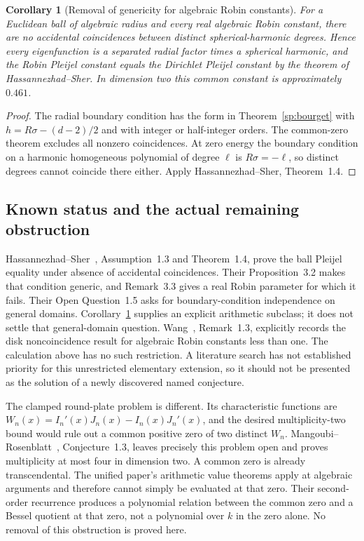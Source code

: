 \documentclass[11pt]{article}
\newtheorem{corollary}[theorem]{Corollary}
\theoremstyle{definition}
\theoremstyle{remark}
\begin{document}
\begin{corollary}[Removal of genericity for algebraic Robin constants]
\label{sp:pleijel}
For a Euclidean ball of algebraic radius and every real algebraic
Robin constant, there are no accidental coincidences between distinct
spherical-harmonic degrees.  Hence every eigenfunction is a separated
radial factor times a spherical harmonic, and the Robin Pleijel
constant equals the Dirichlet Pleijel constant by the theorem of
Hassannezhad--Sher.  In dimension two this common constant is
approximately $0.461$.
\end{corollary}
\begin{proof}
The radial boundary condition has the form in
Theorem~\ref{sp:bourget} with
$h=R\sigma-(d-2)/2$ and with integer or half-integer orders.
The common-zero theorem excludes all nonzero coincidences.  At zero
energy the boundary condition on a harmonic homogeneous polynomial of
degree $\ell$ is $R\sigma=-\ell$, so distinct degrees cannot coincide
there either.  Apply Hassannezhad--Sher, Theorem~1.4.
\end{proof}

\subsection{Known status and the actual remaining obstruction}

Hassannezhad--Sher~\cite{HS2024}, Assumption~1.3 and Theorem~1.4, prove the
ball Pleijel equality under absence of accidental coincidences.  Their
Proposition~3.2 makes that condition generic, and Remark~3.3 gives a
real Robin parameter for which it fails.  Their Open Question~1.5
asks for boundary-condition independence on general domains.
Corollary~\ref{sp:pleijel} supplies an explicit arithmetic subclass;
it does not settle that general-domain question.  Wang~\cite{Wang2023},
Remark~1.3, explicitly records the disk noncoincidence result for
algebraic Robin constants less than one.  The calculation above has
no such restriction.  A literature search has not established priority
for this unrestricted elementary extension, so it should not be
presented as the solution of a newly discovered named conjecture.

The clamped round-plate problem is different.  Its characteristic
functions are
$W_n(x)=I_n'(x)J_n(x)-I_n(x)J_n'(x)$, and the desired multiplicity-two
bound would rule out a common positive zero of two distinct $W_n$.
Mangoubi--Rosenblatt~\cite{MR2026}, Conjecture~1.3, leaves precisely
this problem open and proves multiplicity at most four in dimension
two.  A common zero is already transcendental.  The unified paper's
arithmetic value theorems apply at algebraic arguments and therefore
cannot simply be evaluated at that zero.  Their second-order
recurrence produces a polynomial relation between the common zero and
a Bessel quotient at that zero, not a polynomial over $k$ in the zero
alone.  No removal of this obstruction is proved here.
\end{document}
